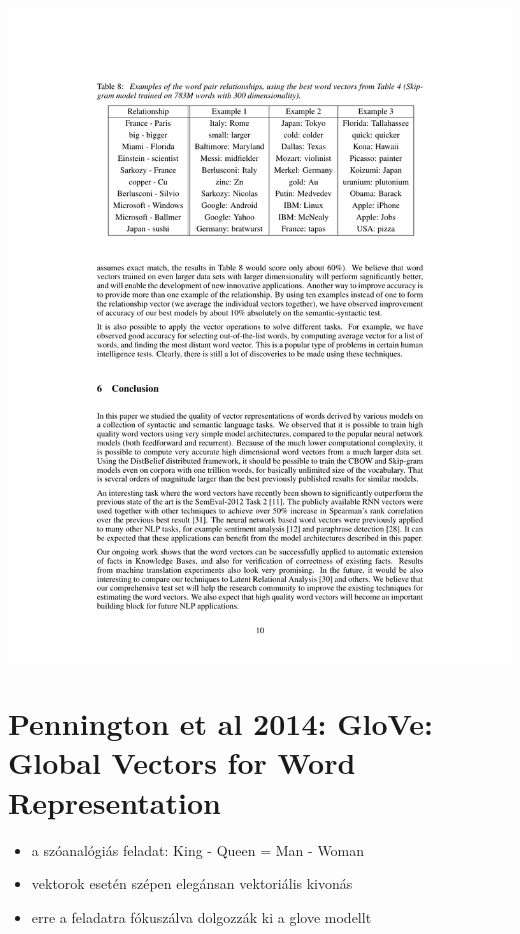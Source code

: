 \documentclass{beamer}
\begin{document}
\begin{frame}
\includegraphics[width=\linewidth]{mikolov-example-relationships}
\end{frame}

\section{Pennington et al 2014: GloVe: Global Vectors for Word Representation}

\begin{frame}

\begin{itemize}
\item a szóanalógiás feladat: King - Queen = Man - Woman

\item vektorok esetén szépen elegánsan vektoriális kivonás

\item erre a feladatra fókuszálva dolgozzák ki a glove modellt
\end{itemize}
\end{frame}
\end{document}
